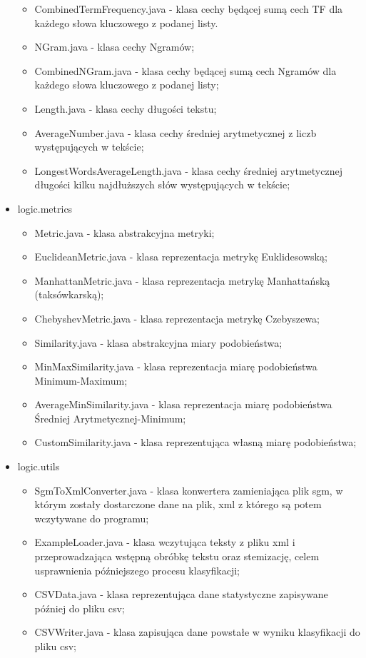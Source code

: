 \documentclass{classrep}
\begin{document}
\begin{itemize}
\begin{itemize}

		\item CombinedTermFrequency.java - klasa cechy będącej sumą cech TF dla każdego słowa kluczowego z podanej listy.
		\item NGram.java - klasa cechy Ngramów;
		\item CombinedNGram.java - klasa cechy będącej sumą cech Ngramów dla każdego słowa kluczowego z podanej listy;
		\item Length.java - klasa cechy długości tekstu;
		\item AverageNumber.java - klasa cechy średniej arytmetycznej z liczb występujących w tekście;
		\item LongestWordsAverageLength.java - klasa cechy średniej arytmetycznej długości kilku najdłuższych słów występujących w tekście;
	\end{itemize}
	\item logic.metrics
	\begin{itemize}
		\item Metric.java - klasa abstrakcyjna metryki;
		\item EuclideanMetric.java - klasa reprezentacja metrykę Euklidesowską;
		\item ManhattanMetric.java - klasa reprezentacja metrykę Manhattańską (taksówkarską);
		\item ChebyshevMetric.java - klasa reprezentacja metrykę Czebyszewa;
		\item Similarity.java - klasa abstrakcyjna miary podobieństwa;
		\item MinMaxSimilarity.java - klasa reprezentacja miarę podobieństwa Minimum-Maximum;
		\item AverageMinSimilarity.java - klasa reprezentacja miarę podobieństwa Średniej Arytmetycznej-Minimum;
		\item CustomSimilarity.java - klasa reprezentująca własną miarę podobieństwa;
	\end{itemize}
	\item logic.utils
	\begin{itemize}
		\item SgmToXmlConverter.java - klasa konwertera zamieniająca plik sgm, w którym zostały dostarczone dane na plik, xml z którego są potem wczytywane do programu;
		\item ExampleLoader.java - klasa wczytująca teksty z pliku xml i przeprowadzająca wstępną obróbkę tekstu oraz stemizację, celem usprawnienia późniejszego procesu klasyfikacji;
		\item CSVData.java - klasa reprezentująca dane statystyczne zapisywane później do pliku csv;
		\item CSVWriter.java - klasa zapisująca dane powstałe w wyniku klasyfikacji do pliku csv;
	\end{itemize}
\end{itemize}
\end{document}
